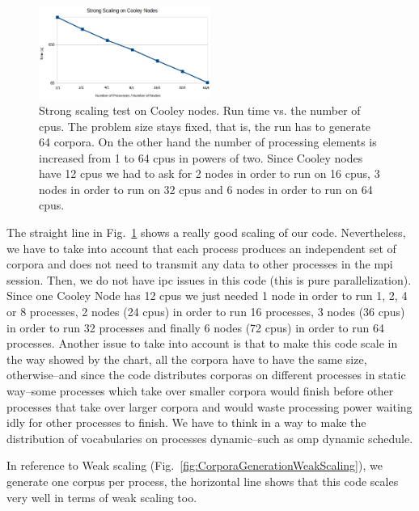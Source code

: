 \documentclass[11pt,a4paper]{article}
\begin{document}
\begin{figure}[h!]
    \centering
    \includegraphics[width=0.5\textwidth]{CorporaGenerationStrongScaling.png}
    \caption{Strong scaling test on Cooley nodes. Run time vs. the number of \glspl{cpu}. The problem size stays fixed, that is, the run has to generate 64 corpora. On the other hand the number of processing elements is increased from 1 to 64 \glspl{cpu} in powers of two. Since Cooley nodes have 12 \glspl{cpu} we had to ask for 2 nodes in order to run on 16 \glspl{cpu}, 3 nodes in order to run on 32 \glspl{cpu} and 6 nodes in order to run on 64 \glspl{cpu}.}
    \label{fig:CorporaGenerationStrongScaling}
\end{figure}

The straight line in Fig.~\ref{fig:CorporaGenerationStrongScaling} shows a really good scaling of our code. Nevertheless, we have to take into account that each process produces an independent set of corpora and does not need to transmit any data to other processes in the \gls{mpi} session. Then, we do not have \gls{ipc} issues in this code (this is pure parallelization). Since one Cooley Node has 12 \glspl{cpu} we just needed 1 node in order to run 1, 2, 4 or 8 processes, 2 nodes (24 \glspl{cpu}) in order to run 16 processes, 3 nodes (36 \glspl{cpu}) in order to run 32 processes and finally 6 nodes (72 \glspl{cpu}) in order to run 64 processes. Another issue to take into account is that to make this code scale in the way showed by the chart, all the corpora have to have the same size, otherwise--and since the code distributes corporas on different processes in static way--some processes which take over smaller corpora would finish before other processes that take over larger corpora and would waste processing power waiting idly for other processes to finish. We have to think in a way to make the distribution of vocabularies on processes dynamic--such as \gls{omp} dynamic schedule.

In reference to Weak scaling (Fig.~\ref{fig:CorporaGenerationWeakScaling}), we generate one corpus per process, the horizontal line shows that this code scales very well  in terms of weak scaling too.
\end{document}
